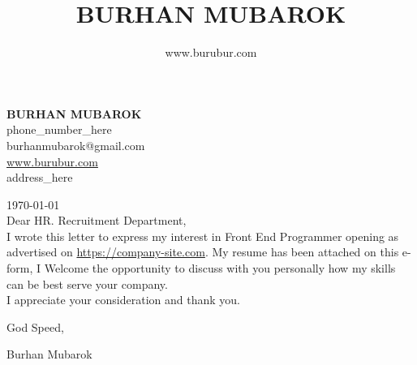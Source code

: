 \documentclass[14pt,a4paper,english]{article}
\title{BURHAN MUBAROK}
\author{www.burubur.com}
\begin{document}

\begin{center}
	\begin{singlespace}
\textbf{\large BURHAN MUBAROK}\\
phone\_number\_here\ \\
burhanmubarok@gmail.com \\
\url{www.burubur.com} \\
address\_here
	\end{singlespace}
\end{center}

\vspace{1cm}
\noindent\today
\vspace{5mm}\\
Dear HR. Recruitment Department,
\vspace{5mm}\\
\noindent I wrote this letter to express my interest in Front End Programmer opening as advertised on \url{https://company-site.com}. My resume has been attached on this e-form, I Welcome the opportunity to discuss with you personally how my skills can be best serve your company.\\
I appreciate your consideration and thank you.

\vspace{2cm}
\hfill
\begin{minipage}[t]{7cm}
	\flushright
	God Speed,\\
	\vspace{1cm}
	
	Burhan Mubarok\\
\end{minipage}
\end{document}
